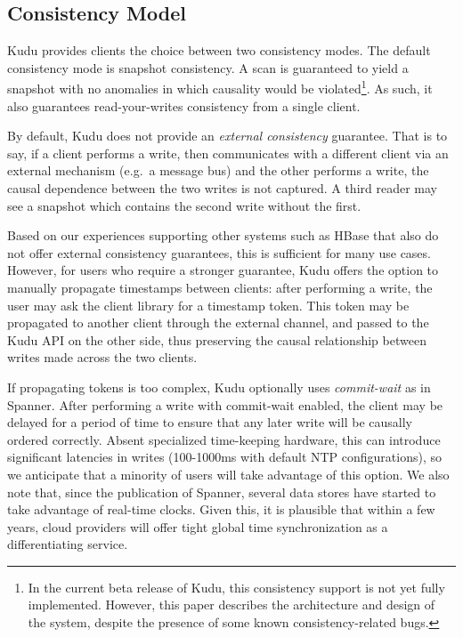 \documentclass[twocolumn,9pt]{article}
\begin{document}
\subsection{Consistency Model}
Kudu provides clients the choice between two consistency modes. The default consistency mode is snapshot
consistency. A scan is guaranteed to yield a snapshot with no anomalies in which causality would be
violated\footnote{In the current beta release of Kudu, this consistency support is not yet fully implemented.
However, this paper describes the architecture and design of the system, despite the presence of
some known consistency-related bugs.}. As such, it also guarantees read-your-writes consistency from a single client.

By default, Kudu does not provide an {\em external consistency} guarantee. That is to say, if a client
performs a write, then communicates with a different client via an external mechanism (e.g.\ a message
bus) and the other performs a write, the causal dependence between the two writes is not captured.
A third reader may see a snapshot which contains the second write without the first.

Based on our experiences supporting other systems such as HBase that also do not offer external consistency
guarantees, this is sufficient for many use cases. However, for users who require a stronger
guarantee, Kudu offers the option to manually propagate timestamps between clients: after performing
a write, the user may ask the client library for a timestamp token. This token may be propagated to
another client through the external channel, and passed to the Kudu API on the other side, thus preserving
the causal relationship between writes made across the two clients.

If propagating tokens is too complex, Kudu optionally uses {\em commit-wait} as in Spanner\cite{spanner}. After
performing a write with commit-wait enabled, the client may be delayed for a period of time to
ensure that any later write will be causally ordered correctly. Absent specialized time-keeping
hardware, this can introduce significant latencies in writes (100-1000ms with default NTP configurations),
so we anticipate that a minority of users will take advantage of this option. We also note
that, since the publication of Spanner, several data stores have started to take advantage
of real-time clocks. Given this, it is plausible that within a few years, cloud providers
will offer tight global time synchronization as a
differentiating service.
\end{document}
